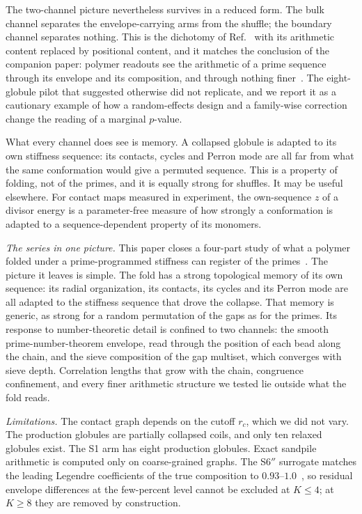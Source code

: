 \documentclass[reprint,amsmath,amssymb,aps,pre,longbibliography]{revtex4-2}
\begin{document}
The two-channel picture nevertheless survives in a reduced form. The bulk channel separates the
envelope-carrying arms from the shuffle; the boundary channel separates nothing. This is the
dichotomy of Ref.~\cite{ANCCFT} with its arithmetic content replaced by positional content, and it
matches the conclusion of the companion paper: polymer readouts see the arithmetic of a prime
sequence through its envelope and its composition, and through nothing finer~\cite{Paper3}. The
eight-globule pilot that suggested otherwise did not replicate, and we report it as a cautionary
example of how a random-effects design and a family-wise correction change the reading of a
marginal $p$-value.

What every channel does see is memory. A collapsed globule is adapted to its own stiffness
sequence: its contacts, cycles and Perron mode are all far from what the same conformation would
give a permuted sequence. This is a property of folding, not of the primes, and it is equally
strong for shuffles. It may be useful elsewhere. For contact maps measured in experiment, the
own-sequence $z$ of a divisor energy is a parameter-free measure of how strongly a conformation is
adapted to a sequence-dependent property of its monomers.

\emph{The series in one picture.} This paper closes a four-part study of what a polymer folded
under a prime-programmed stiffness can register of the primes~\cite{PDTP4,Merged,Paper3}. The
picture it leaves is simple. The fold has a strong topological memory of its own sequence: its
radial organization, its contacts, its cycles and its Perron mode are all adapted to the stiffness
sequence that drove the collapse. That memory is generic, as strong for a random permutation of
the gaps as for the primes. Its response to number-theoretic detail is confined to two channels:
the smooth prime-number-theorem envelope, read through the position of each bead along the chain,
and the sieve composition of the gap multiset, which converges with sieve depth. Correlation
lengths that grow with the chain, congruence confinement, and every finer arithmetic structure we
tested lie outside what the fold reads.

\emph{Limitations.} The contact graph depends on the cutoff $r_c$, which we did not vary. The
production globules are partially collapsed coils, and only ten relaxed globules exist. The S1 arm
has eight production globules. Exact sandpile arithmetic is computed only on coarse-grained graphs.
The S6$''$ surrogate matches the leading Legendre coefficients of the true composition to
$0.93$--$1.0$~\cite{PDTP4}, so residual envelope differences at the few-percent level cannot be
excluded at $K\le4$; at $K\ge8$ they are removed by construction.
\end{document}
